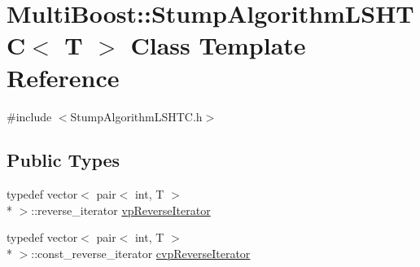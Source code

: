 \hypertarget{classMultiBoost_1_1StumpAlgorithmLSHTC}{\section{Multi\-Boost\-:\-:Stump\-Algorithm\-L\-S\-H\-T\-C$<$ T $>$ Class Template Reference}
\label{classMultiBoost_1_1StumpAlgorithmLSHTC}
}


{\ttfamily \#include $<$Stump\-Algorithm\-L\-S\-H\-T\-C.\-h$>$}

\subsection*{Public Types}
\begin{DoxyCompactItemize}
\item 
typedef vector$<$ pair$<$ int, T $>$\\*
 $>$\-::reverse\-\_\-iterator \hyperlink{classMultiBoost_1_1StumpAlgorithmLSHTC_afb453a312f66e27f2c3a87127b113e58}{vp\-Reverse\-Iterator}
\item 
typedef vector$<$ pair$<$ int, T $>$\\*
 $>$\-::const\-\_\-reverse\-\_\-iterator \hyperlink{classMultiBoost_1_1StumpAlgorithmLSHTC_a22cfd687a3bcfcde844a07a793ec7230}{cvp\-Reverse\-Iterator}
\end{DoxyCompactItemize}
